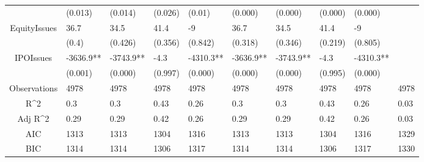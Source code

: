 \documentclass{article}
\begin{document}
\begin{table}[H]
\begin{tabular}{|clllllllll|}
   & (0.013) & (0.014) & (0.026) & (0.01) & (0.000) & (0.000) & (0.000) & (0.000) &  \\ 
  EquityIssues & 36.7 & 34.5 & 41.4 & -9 & 36.7 & 34.5 & 41.4 & -9 &  \\ 
   & (0.4) & (0.426) & (0.356) & (0.842) & (0.318) & (0.346) & (0.219) & (0.805) &  \\ 
  IPOIssues & -3636.9** & -3743.9** & -4.3 & -4310.3** & -3636.9** & -3743.9** & -4.3 & -4310.3** &  \\ 
   & (0.001) & (0.000) & (0.997) & (0.000) & (0.000) & (0.000) & (0.995) & (0.000) &  \\ 
  \hline 
 Observations & 4978 & 4978 & 4978 & 4978 & 4978 & 4978 & 4978 & 4978 & 4978 \\ 
  R^2 & 0.3 & 0.3 & 0.43 & 0.26 & 0.3 & 0.3 & 0.43 & 0.26 & 0.03 \\ 
  Adj R^2 & 0.29 & 0.29 & 0.42 & 0.26 & 0.29 & 0.29 & 0.42 & 0.26 & 0.03 \\ 
  AIC & 1313 & 1313 & 1304 & 1316 & 1313 & 1313 & 1304 & 1316 & 1329 \\ 
  BIC & 1314 & 1314 & 1306 & 1317 & 1314 & 1314 & 1306 & 1317 & 1330 \\ 
   \hline
\end{tabular}
 
\end{table}
\end{document}
